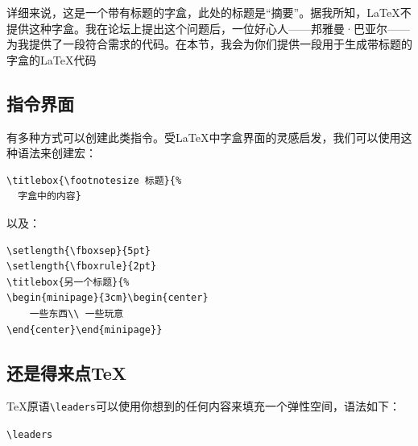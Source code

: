 详细来说，这是一个带有标题的字盒，此处的标题是“摘要”。据我所知，\LaTeX 不提供这种字盒。我在论坛上提出这个问题后，一位好心人——邦雅曼·巴亚尔——为我提供了一段符合需求的代码。在本节，我会为你们提供一段用于生成带标题的字盒的\LaTeX 代码

\subsection{指令界面}

有多种方式可以创建此类指令。受\LaTeX 中字盒界面的灵感启发，我们可以使用这种语法来创建宏：

\begin{codelist}[10.11]{
}
\begin{verbatim}
\titlebox{\footnotesize 标题}{%
  字盒中的内容}\end{verbatim}
\end{codelist}

以及：

\begin{codelist}[10.12]{
    \setlength{\fboxsep}{5pt}
\setlength{\fboxrule}{2pt}
}
\begin{verbatim}
\setlength{\fboxsep}{5pt}
\setlength{\fboxrule}{2pt}
\titlebox{另一个标题}{%
\begin{minipage}{3cm}\begin{center} 
    一些东西\\ 一些玩意
\end{center}\end{minipage}}\end{verbatim}
\end{codelist}

\subsection{还是得来点\TeX}

\TeX 原语\verb|\leaders|可以使用你想到的任何内容来填充一个弹性空间，语法如下：

\begin{dmd}
\verb|\leaders|
\end{dmd}

